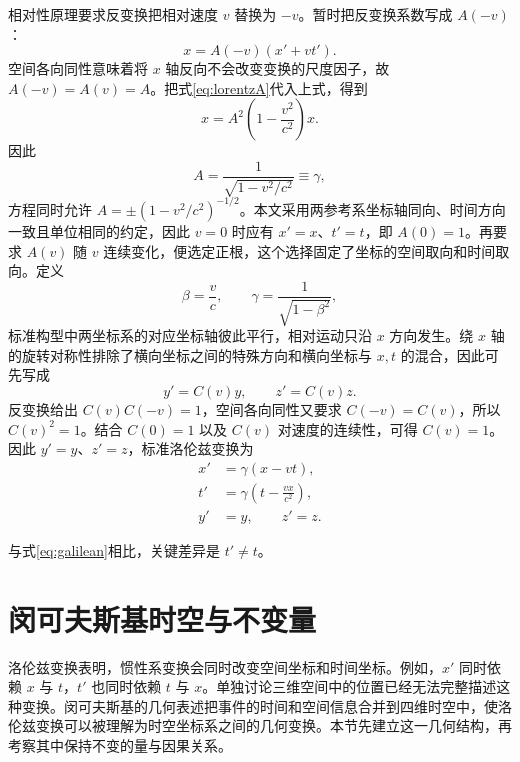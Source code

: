 \documentclass[style=classic,color=full]{lc-article}
\begin{document}
相对性原理要求反变换把相对速度 $v$ 替换为 $-v$。暂时把反变换系数写成 $A(-v)$：
\begin{equation}
  x=A(-v)(x'+vt').
\end{equation}
空间各向同性意味着将 $x$ 轴反向不会改变变换的尺度因子，故 $A(-v)=A(v)=A$。把式\eqref{eq:lorentzA}代入上式，得到
\begin{equation}
  x=A^2\left(1-\frac{v^2}{c^2}\right)x.
\end{equation}
因此
\begin{equation}
  A=\frac{1}{\sqrt{1-v^2/c^2}}\equiv\gamma,
\end{equation}
方程同时允许 $A=\pm(1-v^2/c^2)^{-1/2}$。本文采用两参考系坐标轴同向、时间方向一致且单位相同的约定，因此 $v=0$ 时应有 $x'=x$、$t'=t$，即 $A(0)=1$。再要求 $A(v)$ 随 $v$ 连续变化，便选定正根，这个选择固定了坐标的空间取向和时间取向。定义
\begin{equation}
  \beta=\frac{v}{c},\qquad \gamma=\frac{1}{\sqrt{1-\beta^2}},
\end{equation}
标准构型中两坐标系的对应坐标轴彼此平行，相对运动只沿 $x$ 方向发生。绕 $x$ 轴的旋转对称性排除了横向坐标之间的特殊方向和横向坐标与 $x,t$ 的混合，因此可先写成
\begin{equation*}
  y'=C(v)y,\qquad z'=C(v)z.
\end{equation*}
反变换给出 $C(v)C(-v)=1$，空间各向同性又要求 $C(-v)=C(v)$，所以 $C(v)^2=1$。结合 $C(0)=1$ 以及 $C(v)$ 对速度的连续性，可得 $C(v)=1$。因此 $y'=y$、$z'=z$，标准洛伦兹变换为
\begin{equation}
  \boxed{
  \begin{aligned}
    x'&=\gamma(x-vt),\\
    t'&=\gamma\left(t-\frac{vx}{c^2}\right),\\
    y'&=y,\qquad z'=z.
  \end{aligned}}
  \label{eq:lorentz}
\end{equation}

与式\eqref{eq:galilean}相比，关键差异是 $t'\neq t$。

\clearpage
\section{闵可夫斯基时空与不变量}

洛伦兹变换表明，惯性系变换会同时改变空间坐标和时间坐标。例如，$x'$ 同时依赖 $x$ 与 $t$，$t'$ 也同时依赖 $t$ 与 $x$。单独讨论三维空间中的位置已经无法完整描述这种变换。闵可夫斯基的几何表述把事件的时间和空间信息合并到四维时空中，使洛伦兹变换可以被理解为时空坐标系之间的几何变换。本节先建立这一几何结构，再考察其中保持不变的量与因果关系。
\end{document}
